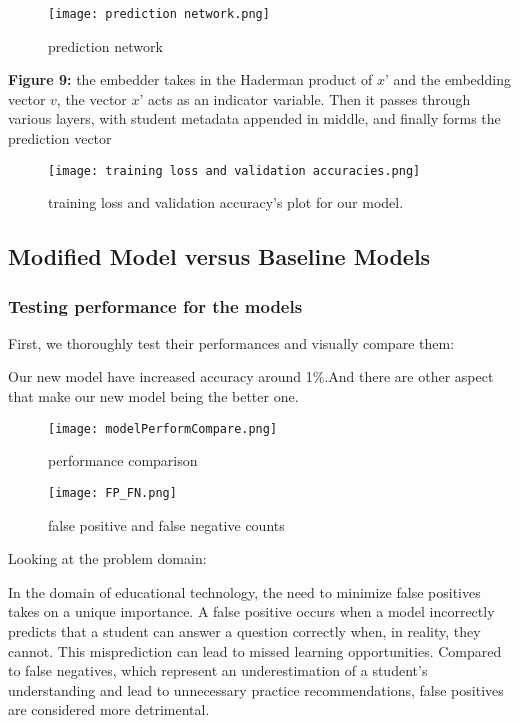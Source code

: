 \documentclass{article}
\begin{document}
\begin{figure}[H]
    \centering
    \texttt{[image: prediction network.png]}
    \caption{prediction network}
    \label{fig:enter-label}
\end{figure}
\textbf{Figure 9:} the embedder takes in the Haderman product of $x’$ and the embedding vector $v$, the vector $x’$ acts as an indicator variable. Then it passes through various layers, with student metadata appended in middle, and finally forms the prediction vector
\begin{figure}[H]
    \centering
    \texttt{[image: training loss and validation accuracies.png]}
    \caption{training loss and validation accuracy's plot for our model.}
    \label{fig:enter-label}
\end{figure}

\subsection*{Modified Model versus Baseline Models}
\subsubsection*{Testing performance for the models
}
First, we thoroughly test their performances and visually compare them:

Our new model have increased accuracy around 1\%.And there are other aspect that make our new model being the better one.
\begin{figure}[H]
    \centering
    \texttt{[image: modelPerformCompare.png]}
    \caption{performance comparison}
    \label{fig:enter-label}
\end{figure}

\begin{figure}[H]
    \centering
    \texttt{[image: FP\_FN.png]}
    \caption{false positive and false negative counts}
    \label{fig:enter-label}
\end{figure}
Looking at the problem domain:

In the domain of educational technology, the need to minimize false positives takes on a unique importance. A false positive occurs when a model incorrectly predicts that a student can answer a question correctly when, in reality, they cannot. This misprediction can lead to missed learning opportunities. Compared to false negatives, which represent an underestimation of a student's understanding and lead to unnecessary practice recommendations, false positives are considered more detrimental.
\end{document}
